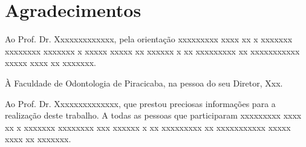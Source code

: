 \section{Agradecimentos} 
Ao Prof. Dr. Xxxxxxxxxxxxx, pela orientação xxxxxxxxx xxxx
xx x xxxxxxx xxxxxxxx xxxxxxx x xxxxx xxxxx xx xxxxxx x xx
xxxxxxxxx xx xxxxxxxxxxx xxxxx xxxx xx xxxxxxx.

À Faculdade de Odontologia de Piracicaba, na pessoa do
seu Diretor, Xxx.

Ao Prof. Dr. Xxxxxxxxxxxxxx, que prestou preciosas
informações para a realização deste trabalho.
A todas as pessoas que participaram xxxxxxxxx xxxx xx x
xxxxxxx xxxxxxxx xxx xxxxxx x xx xxxxxxxxx xx xxxxxxxxxxx xxxxx
xxxx xx xxxxxxx.
